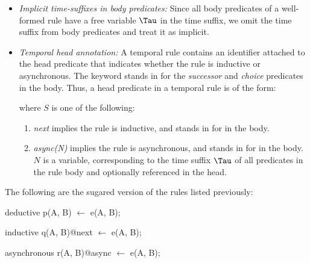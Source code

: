 \begin{itemize}
%
%
\item {\em Implicit time-suffixes in body predicates:} Since all body
predicates of a well-formed rule have a free variable $\Tau$ in the time
suffix, we omit the time suffix from body predicates and treat it as implicit.
%
\item {\em Temporal head annotation:} A temporal rule contains an identifier
attached to the head predicate that indicates whether the rule is inductive or
asynchronous.  The keyword stands in for the {\em successor} and {\em choice}
predicates in the body.  Thus, a head predicate in a temporal rule is of the 
form:


where $S$ is one of the following:
%
\begin{enumerate}
%
\item \emph{next} implies the rule is inductive, and stands in for
 in the body.
%
\item \emph{async(N)} implies the rule is asynchronous, and stands in for
 in the body.  $N$ is a variable,
corresponding to the time suffix $\Tau$ of all predicates in the rule body and
optionally referenced in the head.  
%
\end{enumerate}
%
\end{itemize}


\begin{example}

The following are the sugared version of the rules listed previously:

\begin{Dedalus}
deductive
p(A, B) \(\leftarrow\)
  e(A, B);
  
inductive 
q(A, B)@next \(\leftarrow\)
  e(A, B);
  
asynchronous
r(A, B)@async \(\leftarrow\) 
  e(A, B);
    
\end{Dedalus}
\end{example}


